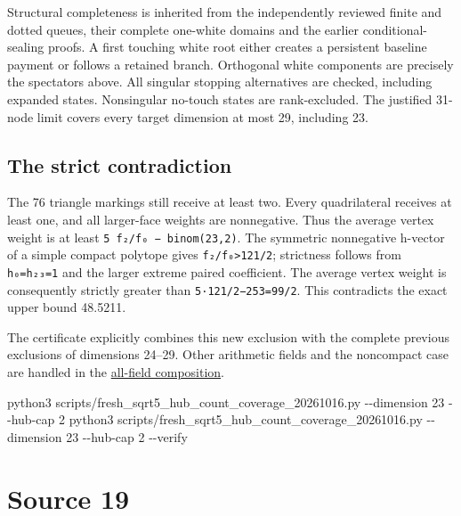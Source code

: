 \documentclass[
  10pt,
]{report}
\newenvironment{Shaded}{}{}
\newcommand{\AttributeTok}[1]{\textcolor[rgb]{0.49,0.56,0.16}{#1}}
\newcommand{\ExtensionTok}[1]{#1}
\newcommand{\NormalTok}[1]{#1}
\begin{document}
Structural completeness is inherited from the independently reviewed
finite and dotted queues, their complete one-white domains and the
earlier conditional-sealing proofs. A first touching white root either
creates a persistent baseline payment or follows a retained branch.
Orthogonal white components are precisely the spectators above. All
singular stopping alternatives are checked, including expanded states.
Nonsingular no-touch states are rank-excluded. The justified 31-node
limit covers every target dimension at most 29, including 23.

\section{The strict contradiction}\label{the-strict-contradiction}

The 76 triangle markings still receive at least two. Every quadrilateral
receives at least one, and all larger-face weights are nonnegative. Thus
the average vertex weight is at least \texttt{5\ f₂/f₀\ −\ binom(23,2)}.
The symmetric nonnegative h-vector of a simple compact polytope gives
\texttt{f₂/f₀\textgreater{}121/2}; strictness follows from
\texttt{h₀=h₂₃=1} and the larger extreme paired coefficient. The average
vertex weight is consequently strictly greater than
\texttt{5·121/2−253=99/2}. This contradicts the exact upper bound
48.5211.

The certificate explicitly combines this new exclusion with the complete
previous exclusions of dimensions 24--29. Other arithmetic fields and
the noncompact case are handled in the
\href{fresh_arithmetic_hub_dimension_composition_20261016.md}{all-field
composition}.

\begin{Shaded}
\begin{Highlighting}[]
\ExtensionTok{python3}\NormalTok{ scripts/fresh\_sqrt5\_hub\_count\_coverage\_20261016.py }\AttributeTok{{-}{-}dimension}\NormalTok{ 23 }\AttributeTok{{-}{-}hub{-}cap}\NormalTok{ 2}
\ExtensionTok{python3}\NormalTok{ scripts/fresh\_sqrt5\_hub\_count\_coverage\_20261016.py }\AttributeTok{{-}{-}dimension}\NormalTok{ 23 }\AttributeTok{{-}{-}hub{-}cap}\NormalTok{ 2 }\AttributeTok{{-}{-}verify}
\end{Highlighting}
\end{Shaded}

\clearpage

\chapter{Source 19}\label{source-19}
\end{document}
